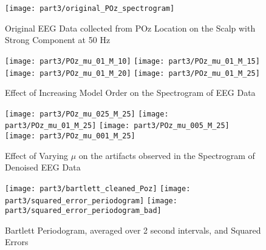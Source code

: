 \begin{figure}[H]
\centering{}
\texttt{[image: part3/original\_POz\_spectrogram]}
\caption{Original EEG Data collected from POz Location on the Scalp with Strong Component at 50 Hz}
\end{figure}


\begin{figure}[H]
\centering{}
\texttt{[image: part3/POz\_mu\_01\_M\_10]}
\texttt{[image: part3/POz\_mu\_01\_M\_15]}
\texttt{[image: part3/POz\_mu\_01\_M\_20]}
\texttt{[image: part3/POz\_mu\_01\_M\_25]}
\caption{Effect of Increasing Model Order on the Spectrogram of EEG Data}
\end{figure}

\begin{figure}[H]
\centering{}
\texttt{[image: part3/POz\_mu\_025\_M\_25]}
\texttt{[image: part3/POz\_mu\_01\_M\_25]}
\texttt{[image: part3/POz\_mu\_005\_M\_25]}
\texttt{[image: part3/POz\_mu\_001\_M\_25]}
\caption{Effect of Varying $\mu$ on the artifacts observed in the Spectrogram of Denoised EEG Data}
\end{figure}


\begin{figure}[H]
\centering{}
\texttt{[image: part3/bartlett\_cleaned\_Poz]}
\texttt{[image: part3/squared\_error\_periodogram]}
\texttt{[image: part3/squared\_error\_periodogram\_bad]}
\caption{Bartlett Periodogram, averaged over 2 second intervals, and Squared Errors}
\end{figure}
